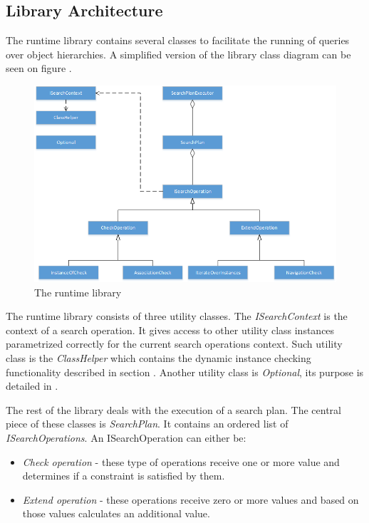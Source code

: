 \subsection{Library Architecture}\label{sect:Runtime_library}

The runtime library contains several classes to facilitate the running of
queries over \CPP{} object hierarchies. A simplified version of the library
class diagram can be seen on figure .

\begin{figure}[!ht]
\centering
\includegraphics[width=150mm, keepaspectratio]{figures/runtime_diagram.png}
\caption{The runtime library}
\label{fig:runtime}
\end{figure}

The runtime library consists of three utility classes. The \emph{ISearchContext}
is the context of a search operation. It gives access to other utility class
instances parametrized correctly for the current search operations context. Such
utility class is the \emph{ClassHelper} which contains the dynamic instance
checking functionality described in section . Another
utility class is \emph{Optional}, its purpose is detailed in
.

The rest of the library deals with the execution of a search plan. The central
piece of these classes is \emph{SearchPlan}. It contains an ordered list of
\emph{ISearchOperations}. An ISearchOperation can either be:

\begin{itemize}
  \item \emph{Check operation} - these type of operations receive one or more
  value and determines if a constraint is satisfied by them.
  \item \emph{Extend operation} - these operations receive zero or more values
  and based on those values calculates an additional value.
\end{itemize}

